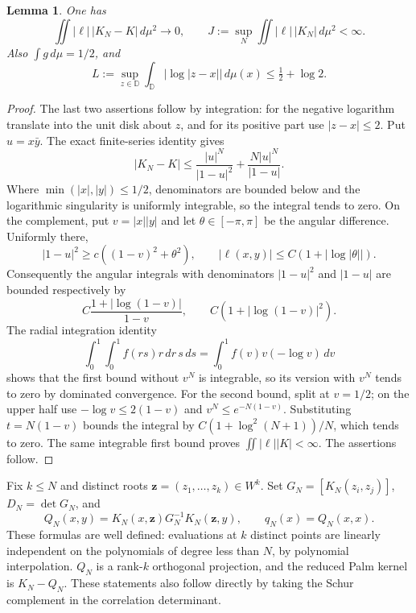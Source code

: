 \documentclass[11pt]{article}
\newtheorem{lemma}[theorem]{Lemma}
\theoremstyle{remark}\newtheorem{remark}[theorem]{Remark}
\begin{document}
\begin{lemma}\label{lem:linear-log-kernel}
One has
\[
 \iint |\ell|\,|K_N-K|\,d\mu^2\longrightarrow0,
 \qquad
 J:=\sup_N\iint |\ell|\,|K_N|\,d\mu^2<\infty.
\]
Also $\int g\,d\mu=1/2$, and
\[
 L:=\sup_{z\in\mathbb D}\int_{\mathbb D}
            |\log|z-x||\,d\mu(x)\le\tfrac12+\log2.
\]
\end{lemma}
\begin{proof}
The last two assertions follow by integration: for the negative logarithm
translate into the unit disk about $z$, and for its positive part use
$|z-x|\le2$. Put $u=x\bar y$. The exact finite-series identity gives
\[
 |K_N-K|\le\frac{|u|^N}{|1-u|^2}
                   +\frac{N|u|^N}{|1-u|}.
\]
Where $\min(|x|,|y|)\le1/2$, denominators are bounded below and the
logarithmic singularity is uniformly integrable, so the integral tends to
zero. On the complement, put $v=|x||y|$ and let $\theta\in[-\pi,\pi]$
be the angular difference. Uniformly there,
\[
 |1-u|^2\ge c((1-v)^2+\theta^2),\qquad
 |\ell(x,y)|\le C(1+|\log|\theta||).
\]
Consequently the angular integrals with denominators $|1-u|^2$ and
$|1-u|$ are bounded respectively by
\[
 C\frac{1+|\log(1-v)|}{1-v},\qquad
 C(1+|\log(1-v)|^2).
\]
The radial integration identity
\[
 \int_0^1\!\int_0^1 f(rs)r\,dr\,s\,ds
       =\int_0^1 f(v)v(-\log v)\,dv
\]
shows that the first bound without $v^N$ is integrable, so its version
with $v^N$ tends to zero by dominated convergence. For the second bound,
split at $v=1/2$; on the upper half use $-\log v\le2(1-v)$ and
$v^N\le e^{-N(1-v)}$. Substituting $t=N(1-v)$ bounds the integral by
$C(1+\log^2(N+1))/N$, which tends to zero. The same integrable first
bound proves $\iint|\ell||K|<\infty$. The assertions follow.
\end{proof}

Fix $k\le N$ and distinct roots $\mathbf z=(z_1,\ldots,z_k)\in W^k$.
Set $G_N=[K_N(z_i,z_j)]$, $D_N=\det G_N$, and
\[
 Q_N(x,y)=K_N(x,\mathbf z)G_N^{-1}K_N(\mathbf z,y),
 \qquad q_N(x)=Q_N(x,x).
\]
These formulas are well defined: evaluations at $k$ distinct points are
linearly independent on the polynomials of degree less than $N$, by
polynomial interpolation. $Q_N$ is a rank-$k$ orthogonal projection,
and the reduced Palm kernel is $K_N-Q_N$. These statements also follow
directly by taking the Schur complement in the correlation determinant.
\end{document}
